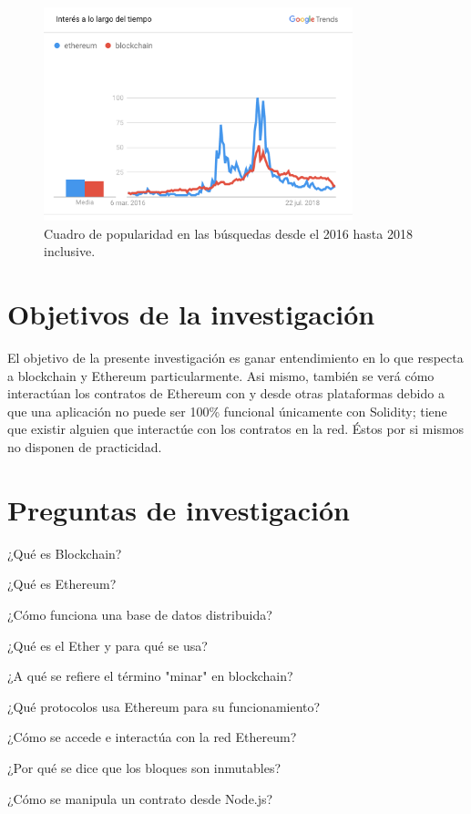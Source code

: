\begin{figure}[htbp!] 
\centering    
\includegraphics[width=0.8\textwidth]{ethereum-trends}
\caption[EthereumTrends]{Cuadro de popularidad en las búsquedas desde el 2016 hasta 2018
inclusive.}
\label{fig:ethereum-trends}
\end{figure}

\section{Objetivos de la investigación}
El objetivo de la presente investigación es ganar entendimiento en lo que respecta a blockchain
y Ethereum particularmente. Asi mismo, también se verá cómo interactúan los contratos de Ethereum
con y desde otras plataformas debido a que una aplicación no puede ser 100\% funcional únicamente 
con Solidity; tiene que existir alguien que interactúe con los contratos en la red. Éstos por si 
mismos no disponen de practicidad.

\section{Preguntas de investigación}
¿Qué es Blockchain?

¿Qué es Ethereum?

¿Cómo funciona una base de datos distribuida?

¿Qué es el Ether y para qué se usa?

¿A qué se refiere el término "minar" en blockchain?

¿Qué protocolos usa Ethereum para su funcionamiento?

¿Cómo se accede e interactúa con la red Ethereum?

¿Por qué se dice que los bloques son inmutables?

¿Cómo se manipula un contrato desde Node.js?

